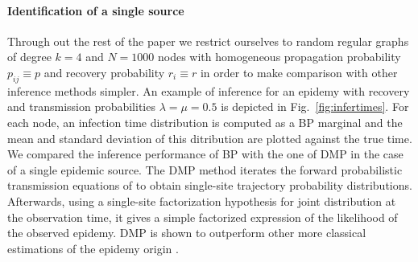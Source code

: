 \paragraph*{Identification of a single source}
Through out the rest of the paper we restrict ourselves to random regular graphs of degree $k=4$ and $N=1000$ nodes with homogeneous propagation probability $p_{ij}\equiv p$ and recovery probability $r_i\equiv r$ in order to make comparison with other inference methods simpler. An example of inference for an epidemy with recovery and transmission probabilities $\lambda=\mu=0.5$ is depicted in Fig.~\ref{fig:infertimes}. For each node, an infection time distribution is computed as a BP marginal and the mean and standard deviation of this ditribution are plotted against the true time.
We compared the inference performance of BP with the one of DMP in the case of a single epidemic source. The DMP method iterates the forward probabilistic transmission equations of \cite{karrer_message_2010} to obtain single-site trajectory probability distributions. Afterwards, using a single-site factorization hypothesis for joint distribution at the observation time, it gives a simple factorized expression of the likelihood of the observed epidemy. DMP is shown \cite{lokhov_inferring_2013} to outperform other more classical estimations of the epidemy origin \cite{shah_detecting_2010,*shah_rumors_2011,comin_identifying_2011}.
